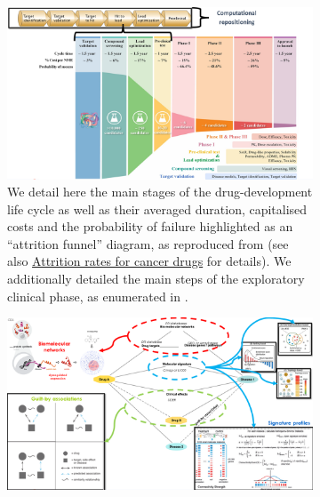 \newpage 
\begin{figure}
     \centering
     \begin{subfigure}[t]{0.8\textwidth}
         \centering
         \includegraphics[width=\textwidth]{figures/repurposing/drug_development_pipeline.png}
         \caption[\textbf{Illustration of the \enquote{valley of death} in drug-development cycle}]{We detail here the main stages of the drug-development life cycle as well as their averaged duration, capitalised costs and the probability of failure highlighted as an \enquote{attrition funnel} diagram, as reproduced from \autocite[Fig.1]{philippe22} (see also \href{https://www.linkedin.com/posts/bigidea_great-image-posted-by-alex-telford-on-probability-activity}{Attrition rates for cancer drugs} for details). We additionally detailed the main steps of the exploratory clinical phase, as enumerated in \autocite{hughes_etal11}.}
         \label{subfig:drug-pipeline}
     \end{subfigure}
     \vfill
     \begin{subfigure}[p]{0.8\textwidth}
         \centering
         \includegraphics[width=\textwidth]{figures/repurposing/repositioning_strategies.png}

\end{subfigure}
\end{figure}
